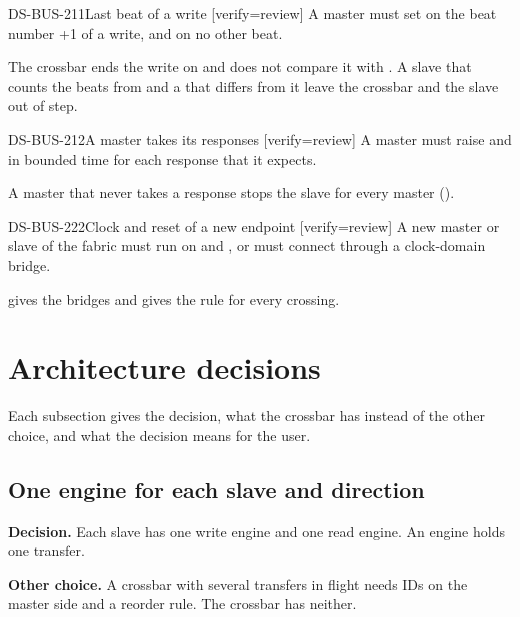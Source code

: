 \begin{requirement}{DS-BUS-211}{Last beat of a write}
[verify={review}]
A master must set  on the beat number +1 of a write, and on no other beat.
\end{requirement}
\begin{information}
The crossbar ends the write on  and does not compare it with . A slave that counts the beats from  and a  that differs from it leave the crossbar and the slave out of step.
\end{information}

\begin{requirement}{DS-BUS-212}{A master takes its responses}
[verify={review}]
A master must raise  and  in bounded time for each response that it expects.
\end{requirement}
\begin{information}
A master that never takes a response stops the slave for every master ().
\end{information}

\begin{requirement}{DS-BUS-222}{Clock and reset of a new endpoint}
[verify={review}]
A new master or slave of the fabric must run on  and , or must connect through a clock-domain bridge.
\end{requirement}
\begin{information}
 gives the bridges and  gives the rule for every crossing.
\end{information}

\section{Architecture decisions}\label{ds:ch:mod-bus-fabric:decisions}
Each subsection gives the decision, what the crossbar has instead of the other choice, and what the decision means for the user.

\subsection{One engine for each slave and direction}\label{ds:ch:mod-bus-fabric:dec-engine}
\textbf{Decision.} Each slave has one write engine and one read engine. An engine holds one transfer.

\textbf{Other choice.} A crossbar with several transfers in flight needs IDs on the master side and a reorder rule. The crossbar has neither.

